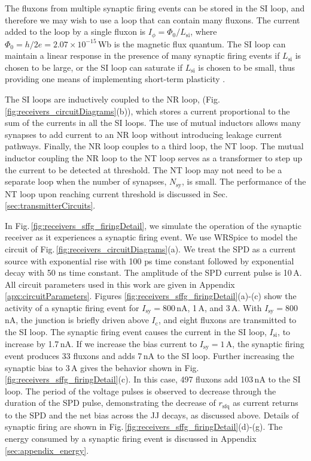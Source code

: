 \documentclass[twocolumn]{article}
\begin{document}
The fluxons from multiple synaptic firing events can be stored in the SI loop, and therefore we may wish to use a loop that can contain many fluxons. The current added to the loop by a single fluxon is $I_{\phi} = \Phi_0/L_{\mathrm{si}}$, where $\Phi_{0} = h/2e = 2.07\times 10^{-15}$\,Wb is the magnetic flux quantum. The SI loop can maintain a linear response in the presence of many synaptic firing events if $L_{\mathrm{si}}$ is chosen to be large, or the SI loop can saturate if $L_{\mathrm{si}}$ is chosen to be small, thus providing one means of implementing short-term plasticity \cite{abre2004}.

The SI loops are inductively coupled to the NR loop, (Fig.\,\ref{fig:receivers_circuitDiagrams}(b)), which stores a current proportional to the sum of the currents in all the SI loops. The use of mutual inductors allows many synapses to add current to an NR loop without introducing leakage current pathways. Finally, the NR loop couples to a third loop, the NT loop. The mutual inductor coupling the NR loop to the NT loop serves as a transformer to step up the current to be detected at threshold. The NT loop may not need to be a separate loop when the number of synapses, $N_{\mathrm{sy}}$, is small. The performance of the NT loop upon reaching current threshold is discussed in Sec.\,\ref{sec:transmitterCircuits}.

In Fig.\,\ref{fig:receivers_sffg_firingDetail}, we simulate the operation of the synaptic receiver as it experiences a synaptic firing event. We use WRSpice \cite{wh1991} to model the circuit of Fig.\,\ref{fig:receivers_circuitDiagrams}(a). We treat the SPD as a current source with exponential rise with 100 ps time constant followed by exponential decay with 50 ns time constant. The amplitude of the SPD current pulse is 10\,\textmu A. All circuit parameters used in this work are given in Appendix \ref{apx:circuitParameters}. Figures \ref{fig:receivers_sffg_firingDetail}(a)-(c) show the activity of a synaptic firing event for $I_{\mathrm{sy}} = 800$\,nA, 1\,\textmu A, and 3\,\textmu A. With $I_{\mathrm{sy}} = 800$\,nA, the junction is briefly driven above $I_{\mathrm{c}}$, and eight fluxons are transmitted to the SI loop. The synaptic firing event causes the current in the SI loop, $I_{\mathrm{si}}$, to increase by 1.7\,nA. If we increase the bias current to $I_{\mathrm{sy}} = 1$\,\textmu A, the synaptic firing event produces 33 fluxons and adds 7\,nA to the SI loop. Further increasing the synaptic bias to 3\,\textmu A gives the behavior shown in Fig.\,\ref{fig:receivers_sffg_firingDetail}(c). In this case, 497 fluxons add 103\,nA to the SI loop. The period of the voltage pulses is observed to decrease through the duration of the SPD pulse, demonstrating the decrease of $r_{\mathrm{sfq}}$ as current returns to the SPD and the net bias across the JJ decays, as discussed above. Details of synaptic firing are shown in Fig.\,\ref{fig:receivers_sffg_firingDetail}(d)-(g). The energy consumed by a synaptic firing event is discussed in Appendix \ref{sec:appendix_energy}.
\end{document}

